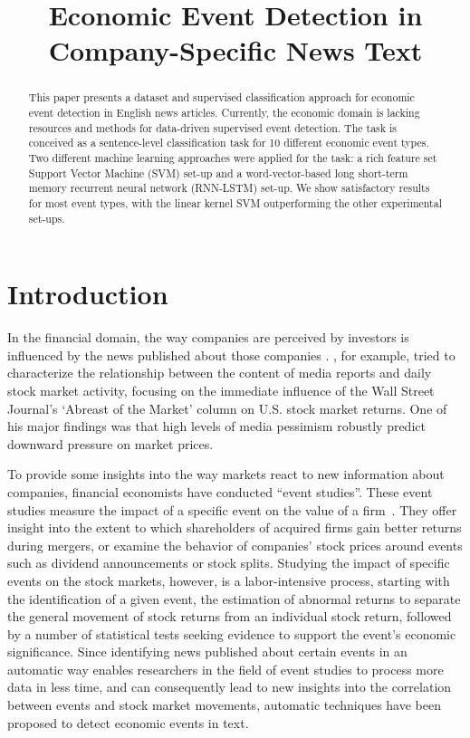 \documentclass[11pt,a4paper]{article}
\title{Economic Event Detection in Company-Specific News Text}
\date{}
\begin{document}
\maketitle
\begin{abstract}
This paper presents a dataset and supervised classification approach for economic event detection in English news articles.
Currently, the economic domain is lacking resources and methods for data-driven supervised event detection.
The task is conceived as a sentence-level classification task for 10 different economic event types.
Two different machine learning approaches were applied for the task: a rich feature set Support Vector Machine (SVM) set-up and a word-vector-based long short-term memory recurrent neural network (RNN-LSTM) set-up.
We show satisfactory results for most event types, with the linear kernel SVM outperforming the other experimental set-ups.
\end{abstract}
\section{Introduction}

In the financial domain, the way companies are perceived by investors is influenced by the news published about those companies \cite{Engle1993, Tetlock2007, Mian2012}.
\citet{Tetlock2007}, for example, tried to characterize the relationship between the content of media reports and daily stock market activity, focusing on the immediate influence of the Wall Street Journal's `Abreast of the Market' column on U.S. stock market returns.
One of his major findings was that high levels of media pessimism robustly predict downward pressure on market prices.

To provide some insights into the way markets react to new information about companies, financial economists have conducted “event studies”.
These event studies measure the impact of a specific event on the value of a firm~\cite{MacKinlay1997}. They
offer insight into the extent to which shareholders of acquired firms gain better returns during mergers, or examine the behavior of companies’ stock prices around events such as dividend announcements or stock splits. 
Studying the impact of specific events on the stock markets, however, is a labor-intensive process, starting with the identification of a given event, the estimation of abnormal returns to separate the general movement of stock returns from an individual stock return, followed by a number of statistical tests seeking evidence to support the event's economic significance.
Since identifying news published about certain events in an automatic way enables researchers in the field of event studies to process more data in less time, and can consequently lead to new insights into the correlation between events and stock market movements, automatic techniques have been proposed to detect economic events in text.
\end{document}

